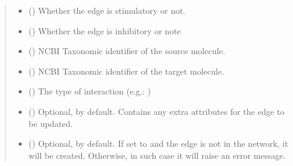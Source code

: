 \documentclass[letterpaper,10pt,english]{sphinxmanual}
\begin{document}
\begin{fulllineitems}
\begin{fulllineitems}
\begin{quote}
\begin{description}
\begin{itemize}
\item {} 
 () \textendash{} Whether the edge is stimulatory or not.

\item {} 
 () \textendash{} Whether the edge is inhibitory or note

\item {} 
 () \textendash{} NCBI Taxonomic identifier of the source molecule.

\item {} 
 () \textendash{} NCBI Taxonomic identifier of the target molecule.

\item {} 
 () \textendash{} The type of interaction (e.g.: )

\item {} 
 () \textendash{} Optional, \sphinxcode{\sphinxupquote{\{\}}} by default. Contains any extra attributes
for the edge to be updated.

\item {} 
 () \textendash{} Optional,  by default. If set to  and the
edge is not in the network, it will be created. Otherwise,
in such case it will raise an error message.

\end{itemize}

\end{description}\end{quote}

\end{fulllineitems}



\end{fulllineitems}
\end{document}
